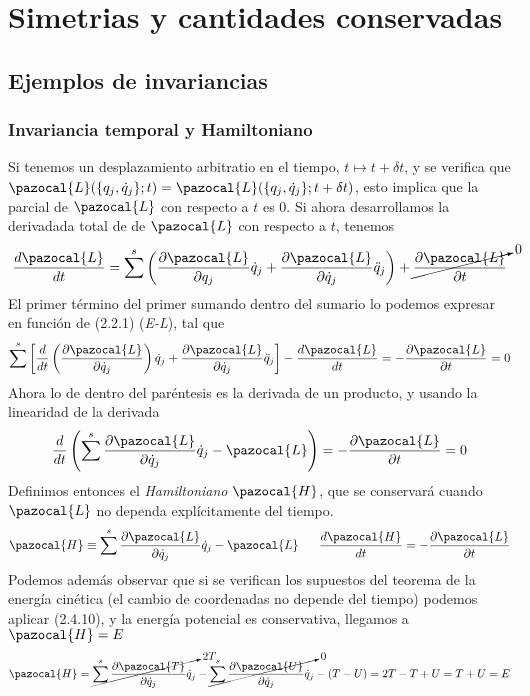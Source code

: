 \chapter{Simetrias y cantidades conservadas}

\section{Ejemplos de invariancias}
\subsection{Invariancia temporal y Hamiltoniano}
Si tenemos un desplazamiento arbitratio en el tiempo, $t\mapsto t + \delta t$, y se verifica que $\pazocal{L}(\{q_j,\dot{q}_j\};t)=\pazocal{L}(\{q_j,\dot{q}_j\};t+\delta t)$, esto implica que la parcial de $\pazocal{L}$ con respecto a $t$ es 0. Si ahora desarrollamos la derivadada total de de $\pazocal{L}$ con respecto a $t$, tenemos
\vspace{-13pt}
\[\frac{d \pazocal{L}}{dt}=\sum^s\left(\frac{\partial \pazocal{L}}{\partial q_j}\dot{q}_j+\frac{\partial \pazocal{L}}{\partial \dot{q}_j}\ddot{q}_j\right)+\cancelto{0}{\frac{\partial \pazocal{L}}{\partial t}}\]
El primer término del primer sumando dentro del sumario lo podemos expresar en función de (2.2.1)  (\textit{E-L}), tal que
\[\sum^s\left[\frac{d}{dt}\left(\frac{\partial \pazocal{L}}{\partial \dot{q}_j}\right)\dot{q}_j+\frac{\partial \pazocal{L}}{\partial \dot{q}_j}\ddot{q}_j\right]-\frac{d \pazocal{L}}{dt} = -\frac{\partial \pazocal{L}}{\partial t} =0\]
Ahora lo de dentro del paréntesis es la derivada de un producto, y usando la linearidad de la derivada
\begin{equation} \label{3.1.1}
    \frac{d}{dt}\left(\sum^s \frac{\partial \pazocal{L}}{\partial \dot{q}_j}\dot{q}_j-\pazocal{L}\right) = -\frac{\partial \pazocal{L}}{\partial t} =0
\end{equation} 
Definimos entonces el \textit{Hamiltoniano} $\pazocal{H}$, que se conservará cuando $\pazocal{L}$ no dependa explícitamente del tiempo.
\begin{equation} \label{3.1.2}
    \pazocal{H} \equiv \sum^s \frac{\partial \pazocal{L}}{\partial \dot{q}_j}\dot{q}_j-\pazocal{L} \ \ \ \ \ \frac{d \pazocal{H}}{dt}=-\frac{\partial \pazocal{L}}{\partial t}
\end{equation}  
Podemos además observar que si se verifican los supuestos del teorema de la energía cinética (el cambio de coordenadas no depende del tiempo) podemos aplicar (2.4.10), y la energía potencial es conservativa, llegamos a $\pazocal{H}=E$
\vspace{-10pt}
\begin{equation} \label{3.1.3}
    \pazocal{H} = \cancelto{2T}{\sum^s\frac{\partial \pazocal{T}}{\partial \dot{q}_j}\dot{q}_j}-\cancelto{0}{\sum^s\frac{\partial \pazocal{U}}{\partial \dot{q}_j}\dot{q}_j}-(T-U)= 2T -T + U = T+U =E 
\end{equation} 

